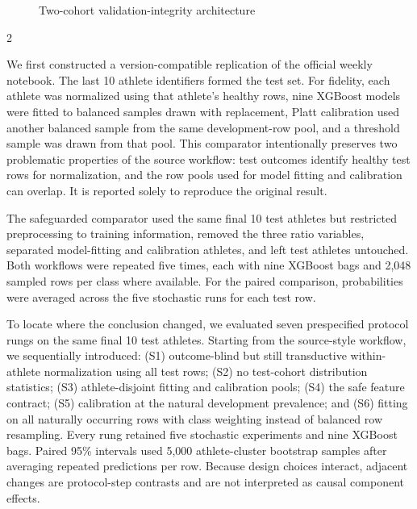 \documentclass[11pt,a4paper]{article}
\begin{document}
\begin{figure}[H]
\caption{Two-cohort validation-integrity architecture}
\label{fig:workflow}
\end{figure}



\begin{multicols}{2}

We first constructed a version-compatible replication of the official weekly notebook. The last 10 athlete identifiers formed the test set. For fidelity, each athlete was normalized using that athlete's healthy rows, nine XGBoost models were fitted to balanced samples drawn with replacement, Platt calibration used another balanced sample from the same development-row pool, and a threshold sample was drawn from that pool. This comparator intentionally preserves two problematic properties of the source workflow: test outcomes identify healthy test rows for normalization, and the row pools used for model fitting and calibration can overlap. It is reported solely to reproduce the original result.

The safeguarded comparator used the same final 10 test athletes but restricted preprocessing to training information, removed the three ratio variables, separated model-fitting and calibration athletes, and left test athletes untouched. Both workflows were repeated five times, each with nine XGBoost bags and 2,048 sampled rows per class where available. For the paired comparison, probabilities were averaged across the five stochastic runs for each test row.

To locate where the conclusion changed, we evaluated seven prespecified protocol rungs on the same final 10 test athletes. Starting from the source-style workflow, we sequentially introduced: (S1) outcome-blind but still transductive within-athlete normalization using all test rows; (S2) no test-cohort distribution statistics; (S3) athlete-disjoint fitting and calibration pools; (S4) the safe feature contract; (S5) calibration at the natural development prevalence; and (S6) fitting on all naturally occurring rows with class weighting instead of balanced row resampling. Every rung retained five stochastic experiments and nine XGBoost bags. Paired 95\% intervals used 5,000 athlete-cluster bootstrap samples after averaging repeated predictions per row. Because design choices interact, adjacent changes are protocol-step contrasts and are not interpreted as causal component effects.


\end{multicols}
\end{document}
